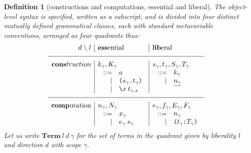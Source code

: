 \documentclass{jfp1}
\newtheorem{definition}[theorem]{Definition}
\newcommand{\Pa}[1]{\texttt{(}#1\texttt{)}}
\newcommand{\dt}{\texttt{.}}
\newcommand{\cn}[2]{\Pa{#1 \dt #2}}
\newcommand{\hb}{\texttt{:}}
\newcommand{\ra}[2]{\Pa{#1 \hb #2}}
\newcommand{\Ne}{\underline}
\begin{document}
\newcommand{\Tm}[3]{\mathbf{Term}\:#1\:#2\:#3}
\begin{definition}[constructions and computations, essential and liberal\label{def:syntax}]
The object-level syntax is specified,
written as a subscript, and
is divided into four distinct mutually defined grammatical classes,
each with standard metavariable conventions,
arranged as four quadrants thus:
\[\begin{array}{r|l|l}
 d \;\backslash\; l& \ess\mbox{ential} & \lib\mbox{eral} \\
\hline
    \cons{truction} & k_\gamma, K_\gamma & s_\gamma, t_\gamma, S_\gamma, T_\gamma \\
    & \;\begin{array}[t]{rl}
          ::= & a \\
          | & \cn{s_\gamma}{t_\gamma} \\
          | & \la xt_{\gamma,x}
        \end{array}
    & \;\begin{array}[t]{rl}
          ::= & k_\gamma \\
          | & \Ne{n_\gamma}
        \end{array}
    \\
    \hline
    \comp\mbox{utation} & n_\gamma, N_\gamma & e_\gamma, f_\gamma, E_\gamma, F_\gamma \\
    & \;\begin{array}[t]{rl}
          ::= & x_\gamma \\
          | & e_\gamma\:s_\gamma 
        \end{array}
    & \;\begin{array}[t]{rl}
          ::= & n_\gamma \\
          | & \ra{t_\gamma}{T_\gamma}
        \end{array}
    \\
  \end{array}\]
Let us write $\Tm ld\gamma$ for the set of terms in the quadrant given
by \emph{liberality} $l$
and \emph{direction} $d$ with scope $\gamma$.
\end{definition}
\end{document}
